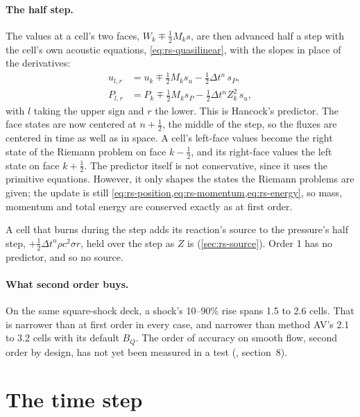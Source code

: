 \paragraph{The half step.} The values at a cell's two faces, $W_k \mp
\tfrac{1}{2}M_k s$, are then advanced half a step with the cell's own
acoustic equations, \cref{eq:rs-quasilinear}, with the slopes in place of
the derivatives:
\begin{equation}
\begin{aligned}
u_{l,r} &= u_k \mp \tfrac{1}{2}M_k s_u - \tfrac{1}{2}\Delta t^n\, s_P, \\
P_{l,r} &= P_k \mp \tfrac{1}{2}M_k s_P - \tfrac{1}{2}\Delta t^n Z_k^2\, s_u ,
\end{aligned}
\label{eq:rs-halfstep}
\end{equation}
with $l$ taking the upper sign and $r$ the lower. This is Hancock's
predictor. The face states are now centered at $n + \tfrac{1}{2}$, the
middle of the step, so the fluxes are centered in time as well as in space.
A cell's left-face values become the right state of the Riemann problem on
face $k - \tfrac{1}{2}$, and its right-face values the left state on face $k
+ \tfrac{1}{2}$. The predictor itself is not conservative, since it uses the
primitive equations. However, it only shapes the states the Riemann
problems are given; the update is still
\cref{eq:rs-position,eq:rs-momentum,eq:rs-energy}, so mass, momentum and
total energy are conserved exactly as at first order.

A cell that burns during the step adds its reaction's source to the
pressure's half step, $+\tfrac{1}{2}\Delta t^n\rho c^2\sigma r$, held over
the step as $Z$ is (\cref{sec:rs-source}). Order 1 has no predictor, and so
no source.

\paragraph{What second order buys.} On the same square-shock deck, a
shock's 10--90\% rise spans 1.5 to 2.6 cells. That is narrower than at
first order in every case, and narrower than method AV's 2.1 to 3.2 cells
with its default $B_Q$. The order of accuracy on smooth flow, second order by
design, has not yet been measured in a test (, section~8).

\section{The time step}
\label{sec:rs-dt}

